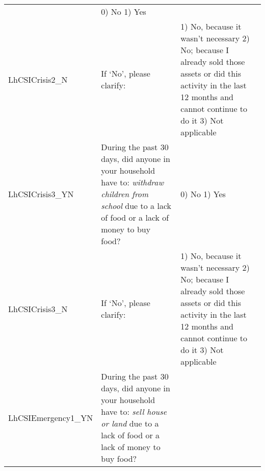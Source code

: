 \documentclass[
]{article}
\begin{document}
\begin{longtable}[]{@{}lll@{}}
\begin{minipage}[t]{0.49\columnwidth}
\end{minipage} & \begin{minipage}[t]{0.27\columnwidth}\raggedright
0) No 1) Yes\strut
\end{minipage}\tabularnewline
\begin{minipage}[t]{0.15\columnwidth}\raggedright
LhCSICrisis2\_N\strut
\end{minipage} & \begin{minipage}[t]{0.49\columnwidth}\raggedright
If `No', please clarify:\strut
\end{minipage} & \begin{minipage}[t]{0.27\columnwidth}\raggedright
1) No, because it wasn't necessary 2) No; because I already sold those assets or did this activity in the last 12 months and cannot continue to do it 3) Not applicable\strut
\end{minipage}\tabularnewline
\begin{minipage}[t]{0.15\columnwidth}\raggedright
LhCSICrisis3\_YN\strut
\end{minipage} & \begin{minipage}[t]{0.49\columnwidth}\raggedright
During the past 30 days, did anyone in your household have to: \emph{withdraw children from school} due to a lack of food or a lack of money to buy food?\strut
\end{minipage} & \begin{minipage}[t]{0.27\columnwidth}\raggedright
0) No 1) Yes\strut
\end{minipage}\tabularnewline
\begin{minipage}[t]{0.15\columnwidth}\raggedright
LhCSICrisis3\_N\strut
\end{minipage} & \begin{minipage}[t]{0.49\columnwidth}\raggedright
If `No', please clarify:\strut
\end{minipage} & \begin{minipage}[t]{0.27\columnwidth}\raggedright
1) No, because it wasn't necessary 2) No; because I already sold those assets or did this activity in the last 12 months and cannot continue to do it 3) Not applicable\strut
\end{minipage}\tabularnewline
\begin{minipage}[t]{0.15\columnwidth}\raggedright
LhCSIEmergency1\_YN\strut
\end{minipage} & \begin{minipage}[t]{0.49\columnwidth}\raggedright
During the past 30 days, did anyone in your household have to: \emph{sell house or land} due to a lack of food or a lack of money to buy food?\strut

\end{minipage}
\end{longtable}
\end{document}
